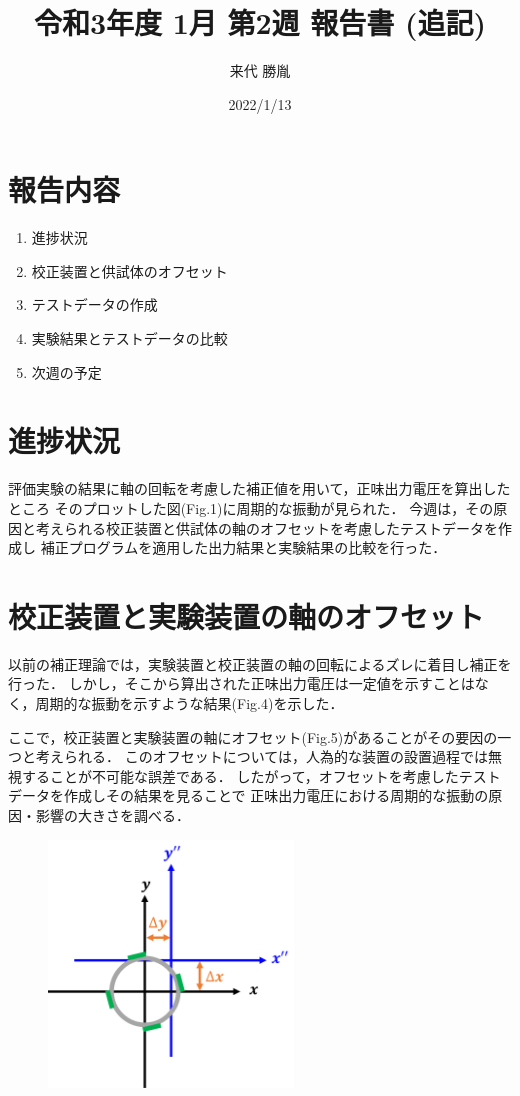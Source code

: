 \documentclass[twocolumn,a4j]{jsarticle}
\author{来代 勝胤}
\title{令和3年度 1月 第2週 報告書 (追記)}
\date{2022/1/13}
\begin{document}
\columnseprule=0.1mm

\maketitle
\section*{報告内容}
\begin{enumerate}[1.]
    \item 進捗状況
    \item 校正装置と供試体のオフセット
    \item テストデータの作成
    \item 実験結果とテストデータの比較
    \item 次週の予定
\end{enumerate}

\section{進捗状況}
評価実験の結果に軸の回転を考慮した補正値を用いて，正味出力電圧を算出したところ
そのプロットした図(Fig.1)に周期的な振動が見られた．
今週は，その原因と考えられる校正装置と供試体の軸のオフセットを考慮したテストデータを作成し
補正プログラムを適用した出力結果と実験結果の比較を行った．

\section{校正装置と実験装置の軸のオフセット}

以前の補正理論では，実験装置と校正装置の軸の回転によるズレに着目し補正を行った．
しかし，そこから算出された正味出力電圧は一定値を示すことはなく，周期的な振動を示すような結果(Fig.4)を示した．\par
ここで，校正装置と実験装置の軸にオフセット(Fig.5)があることがその要因の一つと考えられる．
このオフセットについては，人為的な装置の設置過程では無視することが不可能な誤差である．
したがって，オフセットを考慮したテストデータを作成しその結果を見ることで
正味出力電圧における周期的な振動の原因・影響の大きさを調べる．

\begin{figure}[htbp]
    \footnotesize
    \begin{center}
        \includegraphics[width=65mm]{../images/image_5.png}
        \caption{}
    \end{center}
\end{figure}
\end{document}
